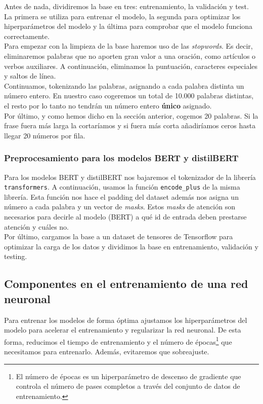 \documentclass[10pt,riqno,a4paper,twoside]{article}\usepackage[]{graphicx}\usepackage[]{color}
\newcommand{\code}[1]{\texttt{#1}}
\begin{document}
\label{preproc_LSTM_FCNN}

Antes de nada, dividiremos la base en tres: entrenamiento, la validación y test. La primera se utiliza para entrenar el modelo, la segunda para optimizar los hiperparámetros del modelo y la última para comprobar que el modelo funciona correctamente.\\ 

Para empezar con la limpieza de la base haremos uso de las \textit{stopwords}. Es decir, eliminaremos palabras que no aporten gran valor a una oración, como artículos o verbos auxiliares. A continuación, eliminamos la puntuación, caracteres especiales y saltos de línea. \\

Continuamos, tokenizando las palabras, asignando a cada palabra distinta un número entero. En nuestro caso cogeremos un total de 10.000 palabras distintas, el resto por lo tanto no tendrán un número entero \textbf{único} asignado. \\

Por último, y como hemos dicho en la sección anterior, cogemos 20 palabras. Si la frase fuera más larga la cortaríamos y si fuera más corta añadiríamos ceros hasta llegar 20 números por fila. 

\subsubsection{Preprocesamiento para los modelos BERT y distilBERT}

Para los modelos BERT y distilBERT nos bajaremos el tokenizador de   la librería \code{transformers}. A continuación, usamos la función \code{encode\_plus} de la misma librería. Esta función nos hace el padding del dataset además nos asigna un número a cada palabra y un vector de \textit{masks}. Estos \textit{masks} de atención son necesarios para decirle al modelo (BERT) a qué id de entrada deben prestarse atención y cuáles no.\\

Por último, cargamos la base a un dataset de tensores de Tensorflow para optimizar la carga de los datos y dividimos la base en entrenamiento, validación y testing. 


\subsection{Componentes en el entrenamiento de una red neuronal}


Para entrenar los modelos de forma óptima ajustamos los hiperparámetros del modelo para acelerar el entrenamiento y regularizar la red neuronal. De esta forma, reducimos el tiempo de entrenamiento y el número de épocas\footnote{El número de épocas es un hiperparámetro de descenso de gradiente que controla el número de pases completos a través del conjunto de datos de entrenamiento.} que necesitamos para entrenarlo. Además, evitaremos que sobreajuste. \\
\end{document}
